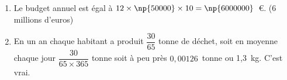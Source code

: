 
\medskip

\begin{enumerate}
\item %
 
Le budget annuel est égal à $12 \times \np{50000} \times 10 = \np{6000000}$~\euro. (6 millions d'euros)
\item %
 
En un an chaque habitant a produit $\dfrac{30}{65}$ tonne de déchet, soit en moyenne chaque jour $\dfrac{30}{65 \times 365}$ tonne  soit à peu près $0,00126$~tonne ou 1,3~kg. C'est vrai. 
\end{enumerate}

\bigskip

